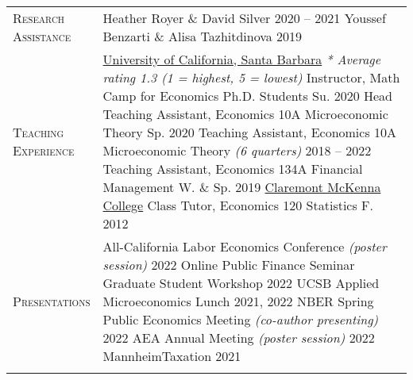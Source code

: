 \documentclass[11pt]{article}
\begin{document}
\begin{tabularx}{\textwidth}{@{}Y Z@{}}
	\textsc{Research \vspace{3pt} \newline Assistance}  & 
	Heather Royer \& David Silver \hfill 2020 -- 2021%
	\vspace{3pt} \newline 
	Youssef Benzarti \& Alisa Tazhitdinova \hfill 2019%
	 \\ \addlinespace[20pt] 
	
	\textsc{Teaching \vspace{3pt} \newline Experience}  & 
	\uline{University of California, Santa Barbara}
	\vspace{3pt} \newline
	\textit{* Average rating 1.3 (1 = highest, 5 = lowest)}
	\vspace{3pt} \newline
	Instructor, Math Camp for Economics Ph.D. Students \hfill Su. 2020%
	\vspace{3pt} \newline
	Head Teaching Assistant, Economics 10A Microeconomic Theory \hfill Sp. 2020%
	\vspace{3pt} \newline
	Teaching Assistant, Economics 10A Microeconomic Theory \textit{(6 quarters)} \hfill 2018 -- 2022%
	\vspace{3pt} \newline
	Teaching Assistant, Economics 134A Financial Management  \hfill W. \& Sp. 2019%
	\vspace{15pt} \newline
	\uline{Claremont McKenna College}
	\vspace{3pt} \newline
	Class Tutor, Economics 120 Statistics \hfill F. 2012%
	 \\ \addlinespace[20pt] 
	
	\textsc{Presentations} & 
	All-California Labor Economics Conference \textit{(poster session)}  \hfill  2022%
	\vspace{3pt} \newline
	Online Public Finance Seminar Graduate Student Workshop \hfill  2022%
	\vspace{3pt} \newline
	UCSB Applied Microeconomics Lunch  \hfill  2021, 2022%
	\vspace{3pt} \newline
	NBER Spring Public Economics Meeting \textit{(co-author presenting)}  \hfill  2022%
	\vspace{3pt} \newline
	AEA Annual Meeting \textit{(poster session)}  \hfill  2022%
	\vspace{3pt} \newline
	MannheimTaxation  \hfill  2021%
	 \\ \addlinespace[20pt] 
	

\end{tabularx}
\end{document}
